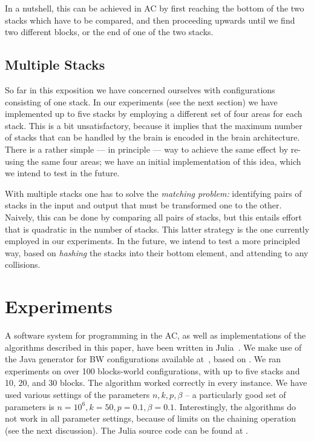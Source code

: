 \documentclass[letterpaper]{article}
\begin{document}
In a nutshell, this can be achieved in AC by first reaching the bottom of the two stacks which have to be compared, and then proceeding upwards until we find two different blocks, or the end of one of the two stacks.

\subsection{Multiple Stacks}
So far in this exposition we have concerned ourselves with configurations consisting of one stack.  In our experiments (see the next section) we have implemented up to five stacks by employing a different set of four areas for each stack. This is a bit unsatisfactory, because it implies that the maximum number of stacks that can be handled by the brain is encoded in the brain architecture. There is a rather simple --- in principle --- way to achieve the same effect by re-using the same four areas; we have an initial implementation of this idea, which we intend to test in the future.  

With multiple stacks one has to solve the {\em matching problem:} identifying pairs of stacks in the input and output that must be transformed one to the other. Naively, this can be done by comparing all pairs of stacks, but this entails effort that is quadratic in the number of stacks. This latter strategy is the one currently employed in our experiments. In the future, we intend to test a more principled way, based on {\em hashing} the stacks into their bottom element, and attending to any collisions. 

\section{Experiments}
\label{sec:experiments}

A software system for programming in the AC, as well as implementations of the algorithms described in this paper, have been written in Julia~\cite{bezanson2017julia}.
We make use of the Java generator for BW configurations available at~\cite{Koeman2020}, based on \cite{slaney2001}. 
We ran experiments on over 100 blocks-world configurations, with up to five stacks and 10, 20, and 30 blocks. 
The algorithm worked correctly in every instance.  We have used various settings of the parameters $n,k,p,\beta$ -- a particularly good set of parameters is $n=10^6,k=50,p=0.1,\beta=0.1$. Interestingly, the algorithms do not work in all parameter settings, because of limits on the chaining operation (see the next discussion). 
The Julia source code can be found at \cite{jBrain}.
\end{document}
